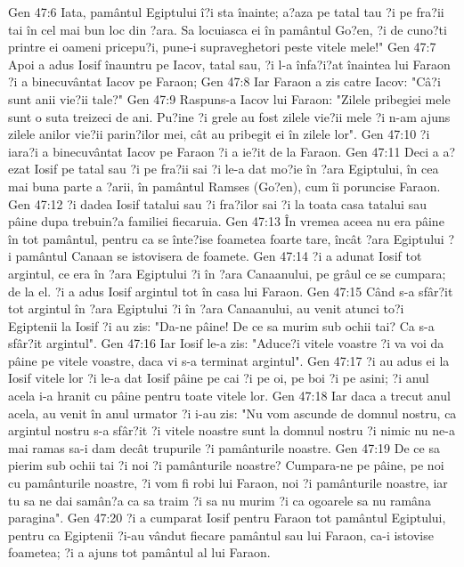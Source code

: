 Gen 47:6  Iata, pamântul Egiptului î?i sta înainte; a?aza pe tatal tau ?i pe fra?ii tai în cel mai bun loc din ?ara. Sa locuiasca ei în pamântul Go?en, ?i de cuno?ti printre ei oameni pricepu?i, pune-i supraveghetori peste vitele mele!"
Gen 47:7  Apoi a adus Iosif înauntru pe Iacov, tatal sau, ?i l-a înfa?i?at înaintea lui Faraon ?i a binecuvântat Iacov pe Faraon;
Gen 47:8  Iar Faraon a zis catre Iacov: "Câ?i sunt anii vie?ii tale?"
Gen 47:9  Raspuns-a Iacov lui Faraon: "Zilele pribegiei mele sunt o suta treizeci de ani. Pu?ine ?i grele au fost zilele vie?ii mele ?i n-am ajuns zilele anilor vie?ii parin?ilor mei, cât au pribegit ei în zilele lor".
Gen 47:10  ?i iara?i a binecuvântat Iacov pe Faraon ?i a ie?it de la Faraon.
Gen 47:11  Deci a a?ezat Iosif pe tatal sau ?i pe fra?ii sai ?i le-a dat mo?ie în ?ara Egiptului, în cea mai buna parte a ?arii, în pamântul Ramses (Go?en), cum îi poruncise Faraon.
Gen 47:12  ?i dadea Iosif tatalui sau ?i fra?ilor sai ?i la toata casa tatalui sau pâine dupa trebuin?a familiei fiecaruia.
Gen 47:13  În vremea aceea nu era pâine în tot pamântul, pentru ca se înte?ise foametea foarte tare, încât ?ara Egiptului ?i pamântul Canaan se istovisera de foamete.
Gen 47:14  ?i a adunat Iosif tot argintul, ce era în ?ara Egiptului ?i în ?ara Canaanului, pe grâul ce se cumpara; de la el. ?i a adus Iosif argintul tot în casa lui Faraon.
Gen 47:15  Când s-a sfâr?it tot argintul în ?ara Egiptului ?i în ?ara Canaanului, au venit atunci to?i Egiptenii la Iosif ?i au zis: "Da-ne pâine! De ce sa murim sub ochii tai? Ca s-a sfâr?it argintul".
Gen 47:16  Iar Iosif le-a zis: "Aduce?i vitele voastre ?i va voi da pâine pe vitele voastre, daca vi s-a terminat argintul".
Gen 47:17  ?i au adus ei la Iosif vitele lor ?i le-a dat Iosif pâine pe cai ?i pe oi, pe boi ?i pe asini; ?i anul acela i-a hranit cu pâine pentru toate vitele lor.
Gen 47:18  Iar daca a trecut anul acela, au venit în anul urmator ?i i-au zis: "Nu vom ascunde de domnul nostru, ca argintul nostru s-a sfâr?it ?i vitele noastre sunt la domnul nostru ?i nimic nu ne-a mai ramas sa-i dam decât trupurile ?i pamânturile noastre.
Gen 47:19  De ce sa pierim sub ochii tai ?i noi ?i pamânturile noastre? Cumpara-ne pe pâine, pe noi cu pamânturile noastre, ?i vom fi robi lui Faraon, noi ?i pamânturile noastre, iar tu sa ne dai samân?a ca sa traim ?i sa nu murim ?i ca ogoarele sa nu ramâna paragina".
Gen 47:20  ?i a cumparat Iosif pentru Faraon tot pamântul Egiptului, pentru ca Egiptenii ?i-au vândut fiecare pamântul sau lui Faraon, ca-i istovise foametea; ?i a ajuns tot pamântul al lui Faraon.
